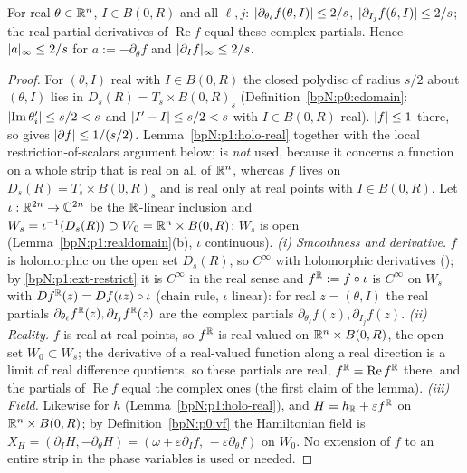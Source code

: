 \begin{lemma}\label{bpN:p12:fbounds}
For real $\theta\in\mathbb{R}^n$, $I\in B(0,R)$ and all $\ell,j$: $\lvert \partial_{\theta_\ell}f(\theta,I)\rvert\le2/s$, $\lvert \partial_{I_j}f(\theta,I)\rvert\le2/s$; the real partial derivatives of $\operatorname{Re}f$ equal these complex partials. Hence $\lvert a\rvert_\infty\le2/s$ for $a:=-\partial_\theta f$ and $\lvert \partial_If\rvert_\infty\le2/s$.
\end{lemma}
\begin{proof}
\label{stepN:p12:fb-poly} For $(\theta,I)$ real with $I\in B(0,R)$ the closed polydisc of radius $s/2$ about $(\theta,I)$ lies in $D_s(R)=T_s\times B(0,R)_s$ (Definition~\ref{bpN:p0:cdomain}: $\lvert \operatorname{Im}\theta'_i\rvert\le s/2<s$ and $\lvert I'-I\rvert\le s/2<s$ with $I\in B(0,R)$ real). \label{stepN:p12:fb-cauchy} $\lvert f\rvert\le1$ there, so  gives $\lvert \partial f\rvert\le1/(s/2)$. \label{stepN:p12:fb-real} Lemma~\ref{bpN:p1:holo-real} together with the local restriction-of-scalars argument below;  is \emph{not} used, because it concerns a function on a whole strip that is real on all of $\mathbb{R}^n$, whereas $f$ lives on $D_s(R)=T_s\times B(0,R)_s$ and is real only at real points with $I\in B(0,R)$. Let $\iota:\mathbb{R}^{2n}\to\mathbb{C}^{2n}$ be the $\mathbb{R}$-linear inclusion and $W_s=\iota^{-1}(D_s(R))\supset W_0=\mathbb{R}^n\times B(0,R)$; $W_s$ is open (Lemma~\ref{bpN:p1:realdomain}(b), $\iota$ continuous). \emph{(i) Smoothness and derivative.} $f$ is holomorphic on the open set $D_s(R)$, so $C^\infty$ with holomorphic derivatives (); by \ref{bpN:p1:ext-restrict} it is $C^\infty$ in the real sense and $f^{\mathbb{R}}:=f\circ\iota$ is $C^\infty$ on $W_s$ with $Df^{\mathbb{R}}(z)=Df(\iota z)\circ\iota$ (chain rule, $\iota$ linear): for real $z=(\theta,I)$ the real partials $\partial_{\theta_\ell}f^{\mathbb{R}}(z),\partial_{I_j}f^{\mathbb{R}}(z)$ are the complex partials $\partial_{\theta_\ell}f(z),\partial_{I_j}f(z)$. \emph{(ii) Reality.} $f$ is real at real points, so $f^{\mathbb{R}}$ is real-valued on $\mathbb{R}^n\times B(0,R)$, the open set $W_0\subset W_s$; the derivative of a real-valued function along a real direction is a limit of real difference quotients, so these partials are real, $f^{\mathbb{R}}=\operatorname{Re}f^{\mathbb{R}}$ there, and the partials of $\operatorname{Re}f$ equal the complex ones (the first claim of the lemma). \emph{(iii) Field.} Likewise for $h$ (Lemma~\ref{bpN:p1:holo-real}), and $H=h_{\mathbb{R}}+\varepsilon f^{\mathbb{R}}$ on $\mathbb{R}^n\times B(0,R)$; by Definition~\ref{bpN:p0:vf} the Hamiltonian field is $X_H=(\partial_IH,-\partial_\theta H)=(\omega+\varepsilon\partial_If,\,-\varepsilon\partial_\theta f)$ on $W_0$. No extension of $f$ to an entire strip in the phase variables is used or needed.
\end{proof}

